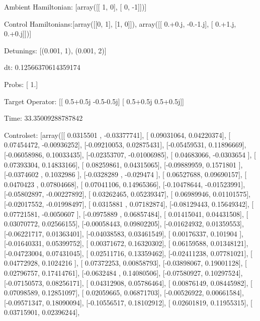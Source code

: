 \documentclass{article}
\begin{document}
    

\newpage

Ambient Hamiltonian: [array([[ 1,  0],
       [ 0, -1]])]

Control Hamiltonians:[array([[0, 1],
       [1, 0]]), array([[ 0.+0.j, -0.-1.j],
       [ 0.+1.j,  0.+0.j]])]

Detunings: [(0.001, 1), (0.001, 2)]

 dt: 0.12566370614359174

Probs: [ 1.]

Target Operator: [[ 0.5+0.5j -0.5-0.5j]
 [ 0.5+0.5j  0.5+0.5j]]

Time: 33.35009288787842

Controlset: [array([[ 0.0315501 , -0.03377741],
       [ 0.09031064,  0.04220374],
       [ 0.07454472, -0.00936252],
       [-0.09210053,  0.02875431],
       [-0.05459531,  0.11896669],
       [-0.06058986,  0.10033435],
       [-0.02353707, -0.01006985],
       [ 0.04683066, -0.0303654 ],
       [ 0.07393304,  0.14833166],
       [ 0.08259861,  0.04315065],
       [-0.09889959,  0.1571801 ],
       [-0.0374602 ,  0.1032986 ],
       [-0.0328289 , -0.029474  ],
       [ 0.06527688,  0.09690157],
       [ 0.0470423 ,  0.07804668],
       [ 0.07041106,  0.14965366],
       [-0.10478644, -0.01523991],
       [-0.05802897, -0.00227892],
       [ 0.03262465,  0.05239347],
       [ 0.06989946,  0.01101575],
       [-0.02017552, -0.01998497],
       [ 0.0315881 ,  0.07182874],
       [-0.08129443,  0.15649342],
       [ 0.07721581, -0.0050607 ],
       [-0.0975889 ,  0.06857484],
       [ 0.01415041,  0.04431508],
       [ 0.03070772,  0.02566155],
       [-0.00058443,  0.09802205],
       [-0.01624932,  0.01359553],
       [-0.06221717,  0.01363401],
       [-0.04038583,  0.03461549],
       [ 0.00176337,  0.101904  ],
       [-0.01640331,  0.05399752],
       [ 0.00371672,  0.16320302],
       [ 0.06159588,  0.01348121],
       [-0.04723004,  0.07431045],
       [ 0.02511716,  0.13359462],
       [-0.02411238,  0.07781021],
       [ 0.04772928,  0.1024216 ],
       [ 0.07372253,  0.00858793],
       [-0.03898067,  0.19001128],
       [ 0.02796757,  0.17414761],
       [-0.0632484 ,  0.14080506],
       [-0.07580927,  0.10297524],
       [-0.07150573,  0.08256171],
       [ 0.04312908,  0.05786464],
       [ 0.00876149,  0.08445982],
       [ 0.07098589,  0.12851097],
       [ 0.02059665,  0.06871703],
       [-0.00526922,  0.00661584],
       [-0.09571347,  0.18090094],
       [-0.10556517,  0.18102912],
       [ 0.02601819,  0.11955315],
       [ 0.03715901,  0.02396244],
\end{document}
